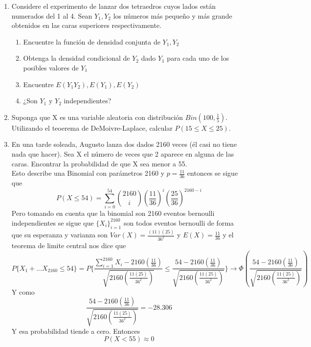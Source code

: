 \documentclass[11pt,a4paper]{report}
\begin{document}
	\begin{enumerate}
		\item{
		
		Considere el experimento de lanzar dos tetraedros cuyos lados están numerados del 1 al 4. Sean $Y_{1},Y_{2}$ los números más pequeño y más grande obtenidos en las caras superiores respectivamente. 
		    
		    \begin{enumerate}
		        \item {Encuentre la función de densidad conjunta de $Y_{1},Y_{2}$}
		        \item{Obtenga la densidad condicional de $Y_{2}$ dado $Y_{1}$ para cada uno de los posibles valores de $Y_{1}$}
		        \item{Encuentre $E(Y_{1}Y_{2}),E(Y_{1}),E(Y_{2})$}
		        \item{¿Son $Y_{1} $ y $Y_{2}$ independientes?}
		    \end{enumerate}
            
		}

		\item{
		Suponga que X es una variable aleatoria con distribución $Bin(100,\frac{1}{5})$. Utilizando el teoerema de DeMoivre-Laplace, calcular $P(15\leq X \leq 25)$. 
		
		}

		\item{
            En una tarde soleada, Augusto lanza dos dados 2160 veces (él casi no tiene nada que hacer). Sea X el número de veces que 2 aparece en alguna de las caras. Encontrar la probabilidad de que X sea menor a 55. \\            Esto describe una Binomial con parámetros 2160 y $p=\frac{11}{36}$ entonces se sigue que $$P(X\leq 54)= \sum_{i=0}^{54}\binom{2160}{i}(\frac{11}{36})^i(\frac{25}{36})^{2160-i}$$
            Pero tomando en cuenta que la binomial son 2160 eventos bernoulli independientes se sigue que $\lbrace X_{i} \rbrace _{i=1}^{2160}$ son todos eventos bernoulli de forma que su esperanza y varianza son $Var(X)=\frac{(11)(25)}{36^2}$ y $E(X)=\frac{11}{36}$ y el teorema de limite central nos dice que 
            $$P\lbrace  X_{1}+...X_{2160}\leq 54 \rbrace = P\lbrace \frac{\sum_{i=1}^{2160}X_{i} -2160(\frac{11}{36})}{\sqrt{2160(\frac{11(25)}{36^2})}}\leq \frac{54-2160(\frac{11}{36})}{\sqrt{2160(\frac{11(25)}{36^2})}}\rbrace \rightarrow \Phi(\frac{54-2160(\frac{11}{36})}{\sqrt{2160(\frac{11(25)}{36^2})}})$$
            Y como
            $$\frac{54-2160(\frac{11}{36})}{\sqrt{2160(\frac{11(25)}{36^2})}}=-28.306$$
            Y esa probabilidad tiende a cero. Entonces $$P(X<55)\approx 0$$
		}


\end{enumerate}
\end{document}
